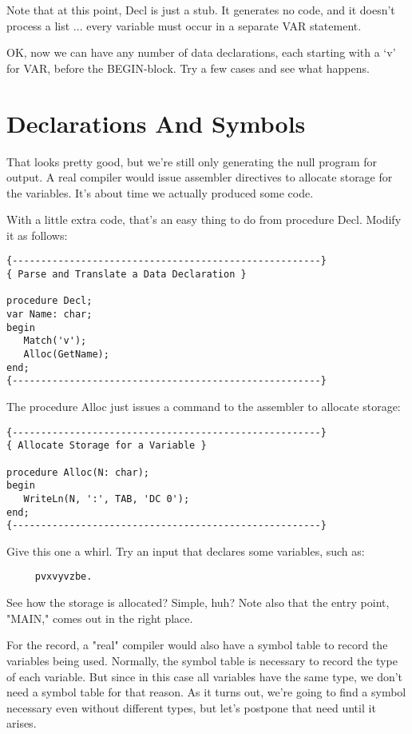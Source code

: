 Note that at this point, Decl  is  just  a stub. It generates no code, and it doesn't process a list ... every variable must occur in a separate VAR statement.

OK, now  we  can have any  number  of  data  declarations, each starting with a `v' for VAR, before  the BEGIN-block. Try a few cases and see what happens.

\section{Declarations And Symbols}

That looks pretty good, but  we're still only generating the null program  for  output. A  real compiler would  issue  assembler directives to allocate storage for  the  variables. It's about time we actually produced some code.

With  a  little  extra  code, that's  an  easy  thing to do from procedure Decl. Modify it as follows:

\begin{verbatim}
{------------------------------------------------------}
{ Parse and Translate a Data Declaration }

procedure Decl;
var Name: char;
begin
   Match('v');
   Alloc(GetName);
end;
{------------------------------------------------------}
\end{verbatim}

The procedure Alloc just  issues  a  command  to the assembler to allocate storage:

\begin{verbatim}
{------------------------------------------------------}
{ Allocate Storage for a Variable }

procedure Alloc(N: char);
begin
   WriteLn(N, ':', TAB, 'DC 0');
end;
{------------------------------------------------------}
\end{verbatim}

Give  this  one  a  whirl. Try  an  input  that declares  some variables, such as:

\begin{verbatim}
     pvxvyvzbe.
\end{verbatim}

See how the storage is allocated?    Simple, huh?  Note also that the entry point, "MAIN," comes out in the right place.

For the record, a "real" compiler would also have a  symbol table to record the variables being used. Normally, the  symbol table is necessary to record the type  of  each variable. But since in this case  all  variables  have  the  same  type, we don't need a symbol  table  for  that reason. As it turns out, we're going to find a symbol  necessary  even without different types, but let's postpone that need until it arises.

